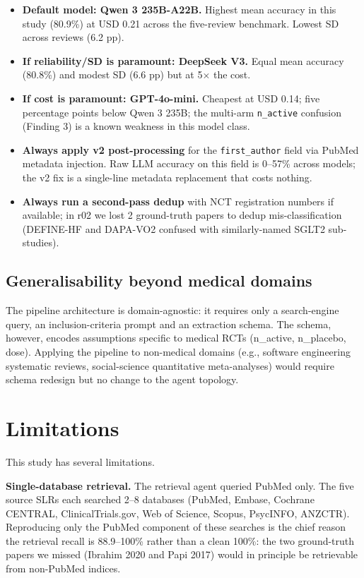 \documentclass[a4paper,fleqn]{cas-sc}
\begin{document}
\begin{itemize}
\item \textbf{Default model: Qwen 3 235B-A22B.} Highest mean accuracy in
this study (80.9\%) at USD 0.21 across the five-review benchmark. Lowest
SD across reviews (6.2 pp).
\item \textbf{If reliability/SD is paramount: DeepSeek V3.} Equal mean
accuracy (80.8\%) and modest SD (6.6 pp) but at 5$\times$ the cost.
\item \textbf{If cost is paramount: GPT-4o-mini.} Cheapest at USD 0.14;
five percentage points below Qwen 3 235B; the multi-arm
\texttt{n\_active} confusion (Finding 3) is a known weakness in this
model class.
\item \textbf{Always apply v2 post-processing} for the
\texttt{first\_author} field via PubMed metadata injection. Raw LLM
accuracy on this field is 0--57\% across models; the v2 fix is a
single-line metadata replacement that costs nothing.
\item \textbf{Always run a second-pass dedup} with NCT registration
numbers if available; in r02 we lost 2 ground-truth papers to
dedup mis-classification (DEFINE-HF and DAPA-VO2 confused with
similarly-named SGLT2 sub-studies).
\end{itemize}

\subsection{Generalisability beyond medical domains}

The pipeline architecture is domain-agnostic: it requires only a
search-engine query, an inclusion-criteria prompt and an extraction
schema. The schema, however, encodes assumptions specific to medical
RCTs (n\_active, n\_placebo, dose). Applying the pipeline to non-medical
domains (e.g., software engineering systematic reviews, social-science
quantitative meta-analyses) would require schema redesign but no change
to the agent topology.

\section{Limitations}\label{sec:limitations}

This study has several limitations.

\textbf{Single-database retrieval.} The retrieval agent queried PubMed
only. The five source SLRs each searched 2--8 databases (PubMed,
Embase, Cochrane CENTRAL, ClinicalTrials.gov, Web of Science, Scopus,
PsycINFO, ANZCTR). Reproducing only the PubMed component of these
searches is the chief reason the retrieval recall is 88.9--100\% rather
than a clean 100\%: the two ground-truth papers we missed (Ibrahim
2020 and Papi 2017) would in principle be retrievable from non-PubMed
indices.
\end{document}
